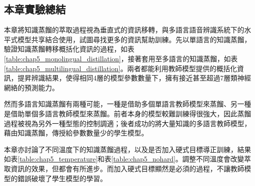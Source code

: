 \subsection{本章實驗總結}    

本章將知識蒸餾的萃取過程視為垂直式的資訊移轉，與多語言語音辨識系統下的水平式模型共享結合使用，試圖尋找更多的資訊幫助訓練。先以單語言的知識蒸餾，驗證知識蒸餾轉移概括化資訊的過程，如表\ref{table:chap5_monolingual_distillation}，接著套用至多語言的知識蒸餾，如表\ref{table:chap5_multilingual_distillation}。兩者都能利用教師模型提供的概括化資訊，提昇辨識結果，使得相同4層的模型參數數量下，擁有接近甚至超過7層類神經網絡的預測能力。

然而多語言知識蒸餾有兩種可能，一種是借助多個單語言教師模型來蒸餾、另一種是借助單個多語言教師模型來蒸餾。前者本身的模型較難訓練得很強大，因此蒸餾過程被視為另外一種型態的控制調適；後者成功的將大量知識的多語言教師模型，藉由知識蒸餾，傳授給參數數量少的學生模型。

本章亦討論了不同溫度下的知識蒸餾過程，以及是否加入硬式目標導正訓練，結果如表\ref{table:chap5_temperature}和表\ref{table:chap5_nohard}。調整不同溫度會改變萃取資訊的效果，但都會有所進步。而加入硬式目標顯然是必須的過程，不讓教師模型的錯誤破壞了學生模型的學習。


